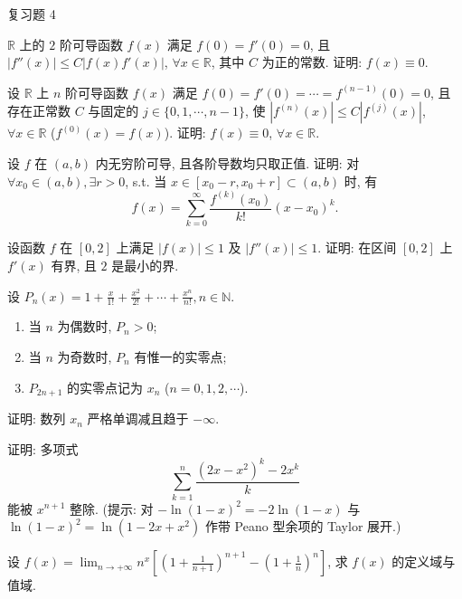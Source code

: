 \begin{exblock}{复习题 4}

\item $\mathbb{R}$ 上的 $2$ 阶可导函数 $f(x)$ 满足 $f(0)=f'(0)=0$, 且 $|f''(x)|\leqslant C|f(x)f'(x)|$, $\forall x\in\mathbb{R}$, 其中 $C$ 为正的常数. 证明: $f(x)\equiv 0$.

\item 设 $\mathbb{R}$ 上 $n$ 阶可导函数 $f(x)$ 满足 $f(0)=f'(0)=\cdots=f^{(n-1)}(0)=0$, 且存在正常数 $C$ 与固定的 $j\in\{0,1,\cdots,n-1\}$, 使 $|f^{(n)}(x)|\leqslant C|f^{(j)}(x)|$, $\forall x\in\mathbb{R}$ ($f^{(0)}(x)=f(x)$). 证明: $f(x)\equiv 0$, $\forall x\in\mathbb{R}$.

\item 设 $f$ 在 $(a,b)$ 内无穷阶可导, 且各阶导数均只取正值. 证明: 对 $\forall x_0 \in (a,b), \exists r>0$, s.t. 当 $x\in[x_0-r, x_0+r]\subset(a,b)$ 时, 有
\[
f(x)=\sum_{k=0}^{\infty}\frac{f^{(k)}(x_0)}{k!}(x-x_0)^k.
\]

\item 设函数 $f$ 在 $[0,2]$ 上满足 $|f(x)|\leqslant 1$ 及 $|f''(x)|\leqslant 1$. 证明: 在区间 $[0,2]$ 上 $f'(x)$ 有界, 且 $2$ 是最小的界.

\item 设 $P_n(x)=1+\frac{x}{1!}+\frac{x^2}{2!}+\cdots+\frac{x^n}{n!}, n\in\mathbb{N}$.
\begin{enumerate}[label=(\arabic*)]
  \item 当 $n$ 为偶数时, $P_n>0$;
  \item 当 $n$ 为奇数时, $P_n$ 有惟一的实零点;
  \item $P_{2n+1}$ 的实零点记为 $x_n$ ($n=0,1,2,\cdots$).
\end{enumerate}
证明: 数列 $x_n$ 严格单调减且趋于 $-\infty$.

\item 证明: 多项式
\[
\sum_{k=1}^{n}\frac{(2x-x^2)^k-2x^k}{k}
\]
能被 $x^{n+1}$ 整除. (提示: 对 $-\ln(1-x)^2=-2\ln(1-x)$ 与 $\ln(1-x)^2=\ln(1-2x+x^2)$ 作带 Peano 型余项的 Taylor 展开.)

\item 设 $f(x)=\lim_{n\to+\infty}n^x\left[\left(1+\frac{1}{n+1}\right)^{n+1}-\left(1+\frac{1}{n}\right)^n\right]$, 求 $f(x)$ 的定义域与值域.


\end{exblock}
